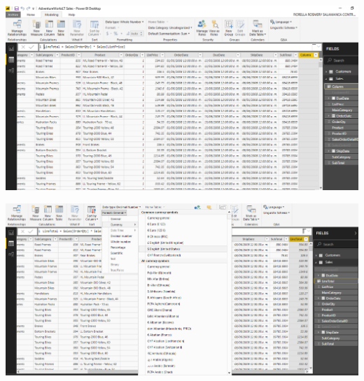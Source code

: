 	\begin{center}
	\includegraphics[width=15cm]{./Imagenes/EJER1T2(6)}
	\end{center}	

	\begin{center}
	\includegraphics[width=15cm]{./Imagenes/EJER1T2(7)}
	\end{center}	

